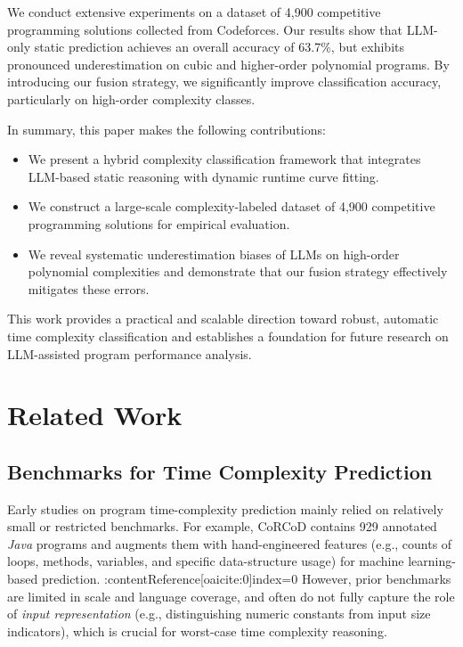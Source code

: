 \documentclass[conference]{IEEEtran}
\begin{document}
We conduct extensive experiments on a dataset of 4,900 competitive programming solutions collected from Codeforces. Our results show that LLM-only static prediction achieves an overall accuracy of 63.7\%, but exhibits pronounced underestimation on cubic and higher-order polynomial programs. By introducing our fusion strategy, we significantly improve classification accuracy, particularly on high-order complexity classes. 

In summary, this paper makes the following contributions: 

\begin{itemize} 
\item We present a hybrid complexity classification framework that integrates LLM-based static reasoning with dynamic runtime curve fitting. 
\item We construct a large-scale complexity-labeled dataset of 4,900 competitive programming solutions for empirical evaluation. 
\item We reveal systematic underestimation biases of LLMs on high-order polynomial complexities and demonstrate that our fusion strategy effectively mitigates these errors. 
\end{itemize} 

This work provides a practical and scalable direction toward robust, automatic time complexity classification and establishes a foundation for future research on LLM-assisted program performance analysis.

\section{Related Work} 
 \label{sec:related_work} 
 
 \subsection{Benchmarks for Time Complexity Prediction} 
 Early studies on program time-complexity prediction mainly relied on relatively small or restricted benchmarks. 
 For example, CoRCoD contains 929 annotated \emph{Java} programs and augments them with hand-engineered features 
 (e.g., counts of loops, methods, variables, and specific data-structure usage) for machine learning-based prediction. :contentReference[oaicite:0]{index=0} 
 However, prior benchmarks are limited in scale and language coverage, and often do not fully capture the role of 
 \emph{input representation} (e.g., distinguishing numeric constants from input size indicators), which is crucial for 
 worst-case time complexity reasoning. 
 
\end{document}
